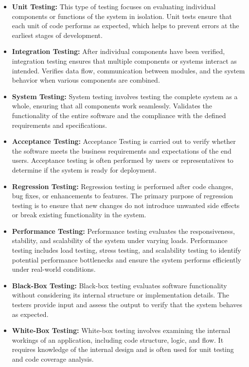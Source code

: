 \begin{itemize}
    \item \textbf{Unit Testing:} This type of testing focuses on evaluating individual components or functions of the system in isolation. Unit tests ensure that each unit of code performs as expected, which helps to prevent errors at the earliest stages of development.
    \item \textbf{Integration Testing:} After individual components have been verified, integration testing ensures that multiple components or systems interact as intended. Verifies data flow, communication between modules, and the system behavior when various components are combined.
    \item \textbf{System Testing:} System testing involves testing the complete system as a whole, ensuring that all components work seamlessly. Validates the functionality of the entire software and the compliance with the defined requirements and specifications.
    \item \textbf{Acceptance Testing:} Acceptance Testing is carried out to verify whether the software meets the business requirements and expectations of the end users. Acceptance testing is often performed by users or representatives to determine if the system is ready for deployment.
    \item \textbf{Regression Testing:} Regression testing is performed after code changes, bug fixes, or enhancements to features. The primary purpose of regression testing is to ensure that new changes do not introduce unwanted side effects or break existing functionality in the system.
    \item \textbf{Performance Testing:} Performance testing evaluates the responsiveness, stability, and scalability of the system under varying loads. Performance testing includes load testing, stress testing, and scalability testing to identify potential performance bottlenecks and ensure the system performs efficiently under real-world conditions.
    \item \textbf{Black-Box Testing:} Black-box testing evaluates software functionality without considering its internal structure or implementation details. The testers provide input and assess the output to verify that the system behaves as expected.
    \item \textbf{White-Box Testing:} White-box testing involves examining the internal workings of an application, including code structure, logic, and flow. It requires knowledge of the internal design and is often used for unit testing and code coverage analysis.
\end{itemize}

